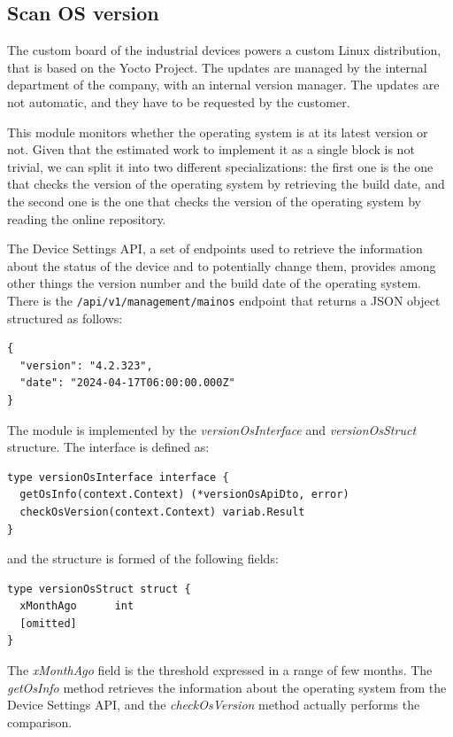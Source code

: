 \subsection{Scan OS version}

The custom board of the industrial devices powers a custom Linux distribution, that is based on the Yocto Project. The updates are managed by the internal department of the company, with an internal version manager. The updates are not automatic, and they have to be requested by the customer.

This module monitors whether the operating system is at its latest version or not. Given that the estimated work to implement it as a single block is not trivial, we can split it into two different specializations: the first one is the one that checks the version of the operating system by retrieving the build date, and the second one is the one that checks the version of the operating system by reading the online repository.

The Device Settings API, a set of endpoints used to retrieve the information about the status of the device and to potentially change them, provides among other things the version number and the build date of the operating system. There is the \texttt{/api/v1/management/mainos} endpoint that returns a JSON object structured as follows:

\begin{lstlisting}
{
  "version": "4.2.323",
  "date": "2024-04-17T06:00:00.000Z"
}
\end{lstlisting}

The module is implemented by the \textit{versionOsInterface} and \textit{versionOsStruct} structure. The interface is defined as:

\begin{lstlisting}[style=golang]
type versionOsInterface interface {
  getOsInfo(context.Context) (*versionOsApiDto, error)
  checkOsVersion(context.Context) variab.Result
}
\end{lstlisting}

and the structure is formed of the following fields:

\begin{lstlisting}[style=golang]
type versionOsStruct struct {
  xMonthAgo      int
  [omitted]
}
\end{lstlisting}

The \textit{xMonthAgo} field is the threshold expressed in a range of few months. The \textit{getOsInfo} method retrieves the information about the operating system from the Device Settings API, and the \textit{checkOsVersion} method actually performs the comparison.

